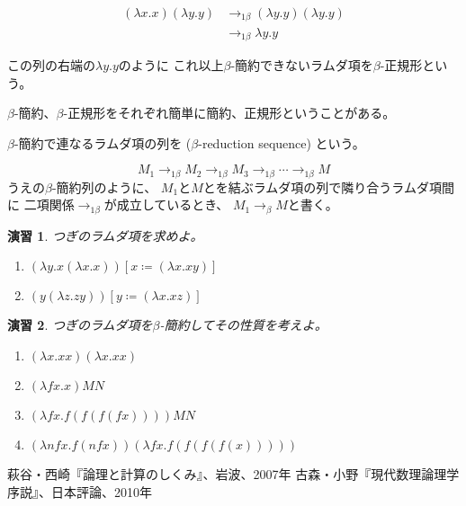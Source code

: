 \documentclass[fleqn]{jsarticle}
\newtheorem{exer}{演習}
\begin{document}
\begin{align*}
  (\lambda x.x)(\lambda y.y) &\to_{1 \beta} (\lambda y.y)(\lambda y.y)\\
                            &\to_{1 \beta} \lambda y.y
\end{align*}

この列の右端の$\lambda y.y$のように
これ以上$\beta$-簡約できないラムダ項を$\beta$-正規形という。

$\beta$-簡約、$\beta$-正規形をそれぞれ簡単に簡約、正規形ということがある。

$\beta$-簡約で連なるラムダ項の列を
 ($\beta$-reduction sequence) という。

\[M_1 \to_{1 \beta} M_2 \to_{1 \beta} M_3 \to_{1 \beta} \cdots \to_{1 \beta} M \]
うえの$\beta$-簡約列のように、
$M_1$と$M$とを結ぶラムダ項の列で隣り合うラムダ項間に
二項関係$\to_{1 \beta}$が成立しているとき、
$M_1 \to_{\beta} M$と書く。



\begin{exer}
つぎのラムダ項を求めよ。

\begin{enumerate}
  \item $( \lambda y.x (\lambda x.x ))[x \coloneqq ( \lambda x.xy)]$
  \item $(y ( \lambda z.zy))[y \coloneqq ( \lambda x.xz)]$
\end{enumerate}
\end{exer}

\begin{exer}
つぎのラムダ項を$\beta$-簡約してその性質を考えよ。

\begin{enumerate}
  \item $( \lambda x.xx)( \lambda x.xx)$
  \item $( \lambda fx.x)MN$
  \item $( \lambda fx.f(f(f(fx))))MN$
  \item $( \lambda nfx. f(nfx))( \lambda fx.f(f(f(f(x)))))$
\end{enumerate}

\end{exer}

\begin{thebibliography}{99}
   萩谷・西崎『論理と計算のしくみ』、岩波、2007年
   古森・小野『現代数理論理学序説』、日本評論、2010年
  \bibitem{} 
\end{thebibliography}
\end{document}
